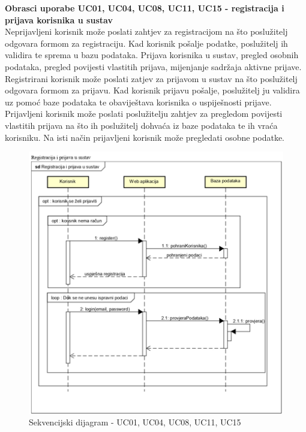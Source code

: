 				
				
				\textbf{Obrasci uporabe UC01, UC04, UC08, UC11, UC15  - registracija i prijava korisnika u sustav}\\
				Neprijavljeni korisnik može poslati zahtjev za registracijom na što poslužitelj odgovara formom za registraciju. Kad korisnik pošalje podatke, poslužitelj ih validira te sprema u bazu podataka. Prijava korisnika u sustav, pregled osobnih podataka, pregled povijesti vlastitih prijava, mijenjanje sadržaja aktivne prijave.\\
				Registrirani korisnik može poslati zatjev za prijavom u sustav na što poslužitelj odgovara formom za prijavu. Kad korisnik prijavu pošalje, poslužitelj ju validira uz pomoć baze podataka te obaviještava korisnika o uspiješnosti prijave. Prijavljeni korisnik može poslati poslužitelju zahtjev za pregledom povijesti vlastitih prijava na što ih poslužitelj dohvaća iz baze podataka te ih vraća korisniku. Na isti način prijavljeni korisnik može pregledati osobne podatke.\\
				
				\begin{figure}[H]
			\includegraphics[scale=1.0]{slike/prijavaiReg.PNG} %
			\centering
			\caption{Sekvencijski dijagram - UC01, UC04, UC08, UC11, UC15}
		\end{figure}
		


